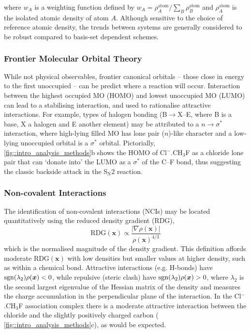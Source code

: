 \documentclass[main.tex]{subfiles}
\begin{document}
where $w_A$ is a weighting function defined by $w_A = \rho_A^\text{atom}/\sum_B \rho_B^\text{atom}$ and $\rho_A^\text{atom}$ is the isolated atomic density of atom $A$. Although sensitive to the choice of reference atomic density, the trends between systems are generally considered to be robust compared to basis-set dependent schemes.\cite{Saha2008}

	
\subsubsection{Frontier Molecular Orbital Theory}

While not physical observables, frontier canonical orbitals -- those close in energy to the first unoccupied -- can be predict where a reaction will occur.\cite{Fukui1952, Woodward1969, Fukui1982} Interaction between the highest occupied MO (HOMO) and lowest unoccupied MO (LUMO) can lead to a stabilising interaction,\cite{albright2013orbital} and used to rationalise attractive interactions. For example, types of halogen bonding (B$\rightarrow$X--E, where B is a base, X a halogen and E another element) may be attributed to a $n\rightarrow \sigma^*$ interaction, where high-lying filled MO has lone pair ($n$)-like character and a low-lying unoccupied orbital is a $\sigma^*$ orbital.\cite{Cavallo2016} Pictorially, \figurename{ \ref{fig::intro_analysis_methods}b} shows the HOMO of Cl${}^{-}$.CH${}_3$F as a chloride lone pair that can `donate into' the LUMO as a $\sigma^*$ of the C--F bond, thus suggesting the classic backside attack in the S${}_\text{N}2$ reaction.

\subsubsection{Non-covalent Interactions}

The identification of non-covalent interactions (NCIs) may be located quantitatively using the reduced density gradient (RDG),\cite{Johnson2010}
\begin{equation}
	\text{RDG}(\boldsymbol{x}) \propto \frac{|\nabla \rho(\boldsymbol{x})|}{\rho(\boldsymbol{x})^{4/3}}
\end{equation}
which is the normalised magnitude of the density gradient. This definition affords moderate $\text{RDG}(\boldsymbol{x})$ with low densities but smaller values at higher density, such as within a chemical bond. Attractive interactions (e.g. H-bonds) have $\operatorname{sgn}(\lambda_2)\rho(\boldsymbol{x})  < 0$, while repulsive (steric clash) have $\operatorname{sgn}(\lambda_2)\rho(\boldsymbol{x}) > 0$, where $\lambda_2$ is the second largest eigenvalue of the Hessian matrix of the density and measures the charge accumulation in the perpendicular plane of the interaction.\cite{Laplaza2020} In the Cl${}^{-}$.CH${}_3$F association complex there is a moderate attractive interaction between the chloride and the slightly positively charged carbon (\figurename{ \ref{fig::intro_analysis_methods}c}), as would be expected.
\end{document}
